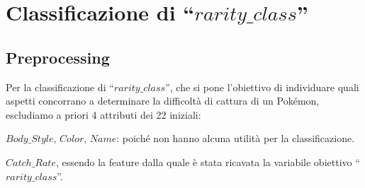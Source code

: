 \documentclass[fleqn,10pt]{SelfArx} %
\begin{document}
\section{Classificazione di ``$rarity\_class$”}
\subsection{Preprocessing}
Per la classificazione di ``$rarity\_class$”, che si pone l'obiettivo di individuare quali aspetti concorrano a determinare la difficoltà di cattura di un Pokémon, escludiamo a priori 4 attributi dei 22 iniziali:

$Body\_Style$, $Color$, $Name$: poiché non hanno alcuna utilità per la classificazione.

$Catch\_Rate$, essendo la feature dalla quale è stata ricavata la variabile obiettivo ``$rarity\_class$”.
\end{document}
